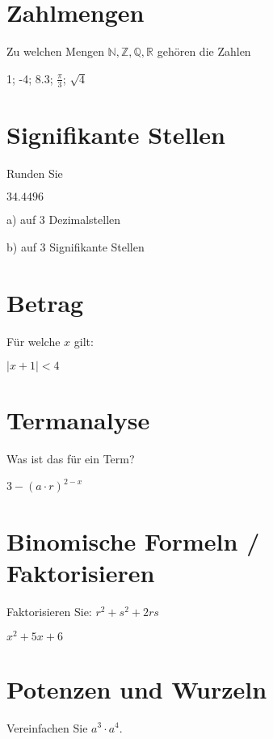 



\usepackage{amssymb} %
\renewcommand{\metaHeaderLine}{Rückblick}
\renewcommand{\arbeitsblattTitel}{1. Jahr TALS}

\arbeitsblattHeader{}

\section{Zahlmengen}
Zu welchen Mengen $\mathbb{N}, \mathbb{Z}, \mathbb{Q}, \mathbb{R}$ gehören die Zahlen

1; -4; 8.3; $\frac{\pi}{3}$; $\sqrt{4}$

\section{Signifikante Stellen}
Runden Sie

$34.4496$

a) auf 3 Dezimalstellen 

b) auf 3 Signifikante Stellen 


\section{Betrag}
Für welche $x$ gilt:

$|x+1| < 4$


\section{Termanalyse}
Was ist das für ein Term?

$3 - (a\cdot{}r)^{2-x}$ 

\section{Binomische Formeln / Faktorisieren}
Faktorisieren Sie:
$r^2 + s^2 + 2rs$    

$x^2 + 5x + 6$ 


\section{Potenzen und Wurzeln}
Vereinfachen Sie $a^3 \cdot{} a^4$. 


